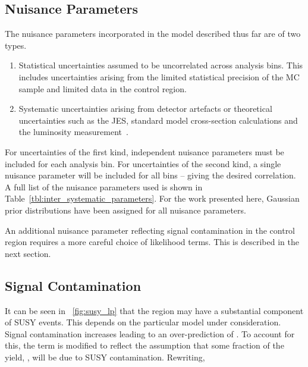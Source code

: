 \subsection{Nuisance Parameters}
The nuisance parameters incorporated in the model described thus far are of two
types.
\begin{enumerate}
\item Statistical uncertainties assumed to be uncorrelated across analysis
  bins. This includes uncertainties arising from the limited statistical
  precision of the \ac{MC} sample and limited data in the control region.
\item Systematic uncertainties arising from detector artefacts or theoretical
  uncertainties such as the \ac{JES}, standard model cross-section calculations
  and the luminosity measurement~\cite{cms_lumi_measurement}.
\end{enumerate}
For uncertainties of the first kind, independent nuisance parameters must be
included for each analysis bin. For uncertainties of the second kind, a single
nuisance parameter will be included for all bins -- giving the desired
correlation. A full list of the nuisance parameters used is shown in
Table~\ref{tbl:inter_systematic_parameters}. For the work presented here,
Gaussian prior distributions have been assigned for all nuisance parameters.



An additional nuisance parameter reflecting signal contamination in the control
region requires a more careful choice of likelihood terms. This is described in
the next section.

\subsection{Signal Contamination}
\label{sec:inter_sig_contam}
It can be seen in \fig~\ref{fig:susy_lp} that the region \LPcontrol may have a
substantial component of \ac{SUSY} events. This depends on the particular model
under consideration. Signal contamination increases \NControl leading to an
over-prediction of \NBkg. To account for this, the \NBkgi term is modified to
reflect the assumption that some fraction of the yield, \NControli, will be due
to \ac{SUSY} contamination. Rewriting,


